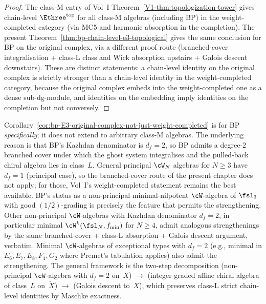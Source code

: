 \begin{proof}
The class-M entry of Vol~I Theorem~\ref{V1-thm:topologization-tower} gives
chain-level $\Ethree^{\mathrm{top}}$ for all class-M algebras
(including BP) in the weight-completed category (via MC5 and
harmonic absorption in the completion). The present
Theorem~\ref{thm:bp-chain-level-e3-topological} gives the same
conclusion for BP on the original complex, via a different proof
route (branched-cover integralisation + class-L class and Wick
absorption upstairs + Galois descent downstairs). These are
distinct statements: a chain-level identity on the original
complex is strictly stronger than a chain-level identity in the
weight-completed category, because the original complex embeds
into the weight-completed one as a dense sub-dg-module, and
identities on the embedding imply identities on the completion
but not conversely.
\end{proof}

\begin{remark}
\label{rem:bp-strengthening-scope}
Corollary~\ref{cor:bp-E3-original-complex-not-just-weight-completed}
is for BP \emph{specifically}; it does not extend to arbitrary
class-M algebras. The underlying reason is that BP's Kazhdan
denominator is $d_f = 2$, so BP admits a degree-$2$ branched cover
under which the ghost system integralises and the pulled-back
chiral algebra lies in class~$L$. General principal $\cW_N$
algebras for $N \ge 3$ have $d_f = 1$ (principal case), so the
branched-cover route of the present chapter does not apply; for
those, Vol~I's weight-completed statement remains the best
available. BP's status as a non-principal minimal-nilpotent
$\cW$-algebra of $\fsl_3$ with good $(1/2)$-grading is precisely
the feature that permits the strengthening. Other non-principal
$\cW$-algebras with Kazhdan denominator $d_f = 2$, in particular
minimal $\cW^{k}(\fsl_N, f_{\min})$ for $N \ge 4$, admit analogous
strengthenings by the same branched-cover + class-L absorption +
Galois descent argument, verbatim. Minimal $\cW$-algebras of
exceptional types with $d_f = 2$ (e.g., minimal in $E_6, E_7, E_8,
F_4, G_2$ where Premet's tabulation applies) also admit the
strengthening. The general framework is the two-step decomposition
(non-principal $\cW$-algebra with $d_f = 2$ on~$X$) $\to$
(integer-graded affine chiral algebra of class~$L$ on~$\widetilde X$)
$\to$ (Galois descent to~$X$), which preserves class-L strict
chain-level identities by Maschke exactness.
\end{remark}

